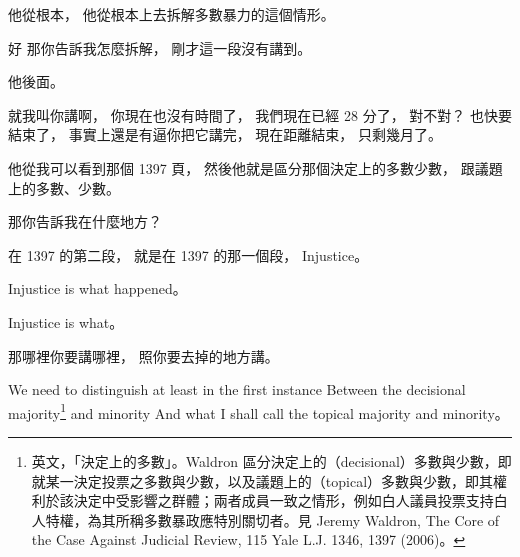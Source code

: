 \hypertarget{w06:cue:2988}{}他從根本，
\hypertarget{w06:cue:2989}{}他從根本上去拆解多數暴力的這個情形。

\hypertarget{w06:cue:2990}{}好 那你告訴我怎麼拆解，
\hypertarget{w06:cue:2991}{}剛才這一段沒有講到。

\hypertarget{w06:cue:2992}{}他後面。

\hypertarget{w06:cue:2993}{}就我叫你講啊，
\hypertarget{w06:cue:2994}{}你現在也沒有時間了，
\hypertarget{w06:cue:2995}{}我們現在已經 28 分了，
\hypertarget{w06:cue:2996}{}對不對？
\hypertarget{w06:cue:2997}{}也快要結束了，
\hypertarget{w06:cue:2998}{}事實上還是有逼你把它講完，
\hypertarget{w06:cue:2999}{}現在距離結束，
\hypertarget{w06:cue:3000}{}只剩幾月了。

\hypertarget{w06:cue:3001}{}他從我可以看到那個 1397 頁，
\hypertarget{w06:cue:3002}{}然後他就是區分那個決定上的多數少數，
\hypertarget{w06:cue:3003}{}跟議題上的多數、少數。

\hypertarget{w06:cue:3004}{}那你告訴我在什麼地方？

\hypertarget{w06:cue:3005}{}在 1397 的第二段，
\hypertarget{w06:cue:3006}{}就是在 1397 的那一個段，
\hypertarget{w06:cue:3007}{}Injustice。

\hypertarget{w06:cue:3008}{}Injustice is what happened。

\hypertarget{w06:cue:3009}{}Injustice is what。

\hypertarget{w06:cue:3010}{}那哪裡你要講哪裡，
\hypertarget{w06:cue:3011}{}照你要去掉的地方講。

\hypertarget{w06:cue:3012}{}We need to distinguish at least in the first instance
\hypertarget{w06:cue:3013}{}Between the decisional majority\footnote{英文，「決定上的多數」。Waldron 區分決定上的（decisional）多數與少數，即就某一決定投票之多數與少數，以及議題上的（topical）多數與少數，即其權利於該決定中受影響之群體；兩者成員一致之情形，例如白人議員投票支持白人特權，為其所稱多數暴政應特別關切者。見 Jeremy Waldron, The Core of the Case Against Judicial Review, 115 Yale L.J. 1346, 1397 (2006)。} and minority
\hypertarget{w06:cue:3014}{}And what I shall call the topical majority and minority。

